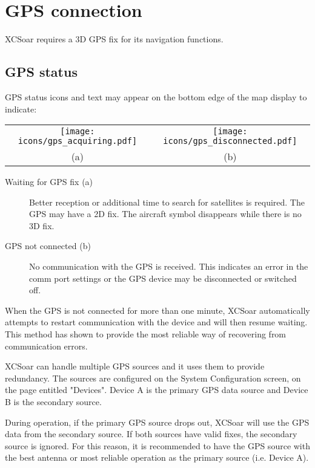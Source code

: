 \section{GPS connection}

XCSoar requires a 3D GPS fix for its navigation functions.

\subsection*{GPS status}

GPS status icons and text may appear on the bottom edge of the
map display to indicate:

\begin{tabular}{c c}%
\texttt{[image: icons/gps\_acquiring.pdf]} & \texttt{[image: icons/gps\_disconnected.pdf]}\\
(a) & (b)
\end{tabular}

\begin{description}
\item[Waiting for GPS fix (a)]  Better reception
  or additional time to search for satellites is required. The GPS may have a 2D fix.
  The aircraft symbol disappears while there is no 3D fix.
\item[GPS not connected (b)]  No communication with the GPS is received.
  This indicates an error in the comm port settings or the GPS device may
  be disconnected or switched off.
\end{description}

When the GPS is not connected for more than one minute, XCSoar automatically 
attempts to restart communication with the device and will then resume waiting. 
This method has shown to provide the most reliable way of recovering from 
communication errors.

XCSoar can handle multiple GPS sources and it uses them to provide redundancy.
The sources are configured on the System Configuration screen, on the page 
entitled "Devices".  Device A is the primary GPS data source and Device B is 
the secondary source.

During operation, if the primary GPS source drops out, XCSoar will use the GPS 
data from the secondary source.  If both sources have valid fixes, the secondary 
source is ignored.  For this reason, it is recommended to have the GPS source 
with the best antenna or most reliable operation as the primary source (i.e. Device A).

